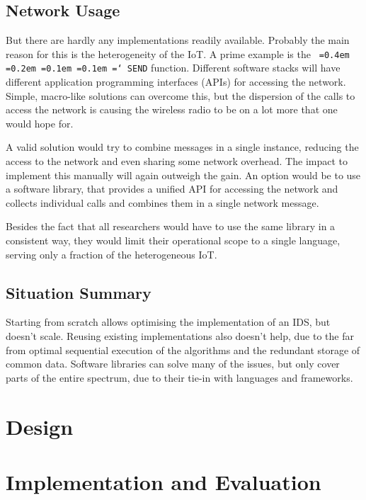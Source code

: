 \documentclass[conference]{IEEEtran}
\newcommand*\justify{%
  \fontdimen2\font=0.4em%
  \fontdimen3\font=0.2em%
  \fontdimen4\font=0.1em%
  \fontdimen7\font=0.1em%
  \hyphenchar\font=`\-%
}
\newcommand{\ttt}[1]{\texttt{\justify{#1}}}
\begin{document}
\subsection{Network Usage}

But there are hardly any implementations readily available. Probably the main
reason for this is the heterogeneity of the IoT. A prime example is the
\ttt{SEND} function. Different software stacks will have different application
programming interfaces (APIs) for accessing the network. Simple, macro-like
solutions can overcome this, but the dispersion of the calls to access the
network is causing the wireless radio to be on a lot more that one would hope
for.

A valid solution would try to combine messages in a single instance, reducing
the access to the network and even sharing some network overhead. The impact to
implement this manually will again outweigh the gain. An option would be to use
a software library, that provides a unified API for accessing the network and
collects individual calls and combines them in a single network message.

Besides the fact that all researchers would have to use the same library in a
consistent way, they would limit their operational scope to a single language,
serving only a fraction of the heterogeneous IoT.

\subsection{Situation Summary}

Starting from scratch allows optimising the implementation of an IDS, but
doesn't scale. Reusing existing implementations also doesn't help, due to the
far from optimal sequential execution of the algorithms and the redundant
storage of common data. Software libraries can solve many of the issues, but
only cover parts of the entire spectrum, due to their tie-in with languages and
frameworks.

\section{Design}
\label{design}



\section{Implementation and Evaluation}
\label{evaluation}
\end{document}
